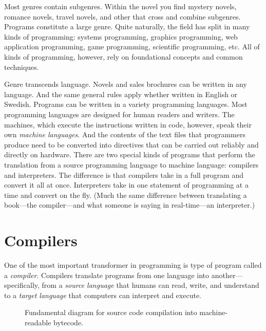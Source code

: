 Most genres contain subgenres. Within the novel you find mystery novels, romance
novels, travel novels, and other that cross and combine subgenres. Programs
constitute a large genre. Quite naturally, the field has split in many kinds of
programming: systems programming, graphics programming, web application
programming, game programming, scientific programming, etc. All of kinds of
programming, however, rely on foundational concepts and common techniques.

Genre transcends language. Novels and sales brochures can be written in any
language. And the same general rules apply whether written in English or
Swedish. Programs can be written in a variety programming languages. Most
programming languages are designed for human readers and writers. The machines,
which execute the instructions written in code, however, speak their own
\emph{machine languages}. And the contents of the text files that programmers
produce need to be converted into directives that can be carried out reliably
and directly on hardware. There are two special kinds of programs that perform
the translation from a source programming language to machine language:
compilers and interpreters. The difference is that compilers take in a full
program and convert it all at once. Interpreters take in one statement of
programming at a time and convert on the fly. (Much the same difference between
translating a book---the compiler---and what someone is saying in real-time---an
interpreter.)

\section{Compilers} One of the most important transformer in programming is type
of program called a \emph{compiler}. Compilers translate programs from one
language into another---specifically, from a \emph{source language} that humans
can read, write, and understand to a \emph{target language} that computers can
interpret and execute.

\begin{figure}[h]
  
\caption{\label{fig:intro-example-compiler} Fundamental diagram for source code
compilation into machine-readable bytecode.}
\end{figure}

